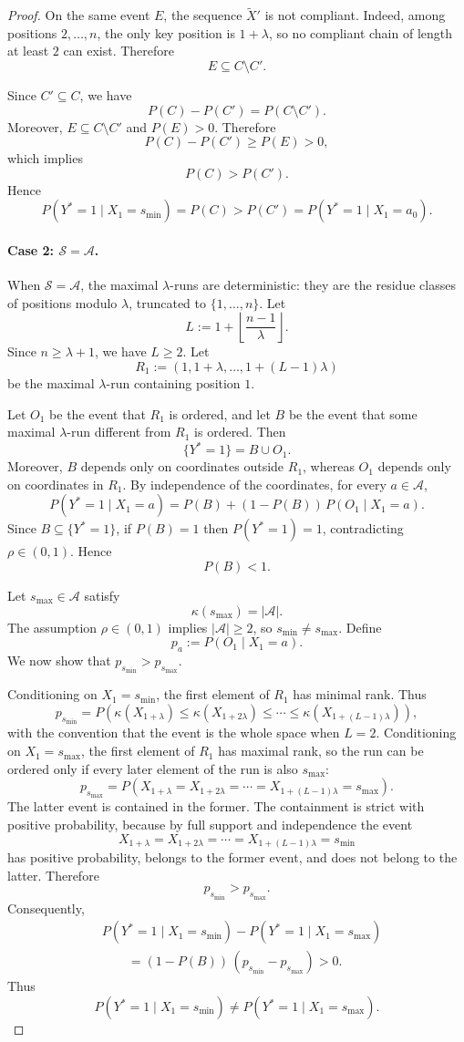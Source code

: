 \documentclass{article}
\theoremstyle{plain}
\theoremstyle{definition}
\theoremstyle{remark}
\begin{document}
\begin{proof}
On the same event $E$, the sequence $\widetilde X'$ is not compliant.
Indeed, among positions $2,\ldots,n$, the only key position is $1+\lambda$,
so no compliant chain of length at least $2$ can exist. Therefore
\[
E \subseteq C\setminus C'.
\]

Since \(C' \subseteq C\), we have
\[
P(C)-P(C') = P(C\setminus C').
\]
Moreover, \(E \subseteq C\setminus C'\) and \(P(E)>0\). Therefore
\[
P(C)-P(C') \ge P(E) > 0,
\]
which implies
\[
P(C) > P(C').
\]
Hence
\[
P(Y^*=1 \mid X_1=s_{\min})
=
P(C)
>
P(C')
=
P(Y^*=1 \mid X_1=a_0).
\]

\paragraph{Case 2: $\mathcal{S}=\mathcal{A}$.}
When $\mathcal{S}=\mathcal{A}$, the maximal $\lambda$-runs are deterministic:
they are the residue classes of positions modulo $\lambda$, truncated to
$\{1,\ldots,n\}$. Let
\[
L := 1+\left\lfloor \frac{n-1}{\lambda}\right\rfloor .
\]
Since $n\geq \lambda+1$, we have $L\geq 2$. Let
\[
R_1 := (1,1+\lambda,\ldots,1+(L-1)\lambda)
\]
be the maximal $\lambda$-run containing position $1$.

Let $O_1$ be the event that $R_1$ is ordered, and let $B$ be the event that
some maximal $\lambda$-run different from $R_1$ is ordered. Then
\[
\{Y^*=1\}=B\cup O_1.
\]
Moreover, $B$ depends only on coordinates outside $R_1$, whereas $O_1$
depends only on coordinates in $R_1$. By independence of the coordinates,
for every $a\in\mathcal{A}$,
\[
P(Y^*=1\mid X_1=a)
=
P(B)+(1-P(B))\,P(O_1\mid X_1=a).
\]
Since $B\subseteq\{Y^*=1\}$, if $P(B)=1$ then $P(Y^*=1)=1$, contradicting
$\rho\in(0,1)$. Hence
\[
P(B)<1.
\]

Let $s_{\max}\in\mathcal{A}$ satisfy
\[
\kappa(s_{\max})=|\mathcal{A}|.
\]
The assumption $\rho\in(0,1)$ implies $|\mathcal{A}|\geq 2$, so
$s_{\min}\neq s_{\max}$. Define
\[
p_a := P(O_1\mid X_1=a).
\]
We now show that $p_{s_{\min}}>p_{s_{\max}}$.

Conditioning on $X_1=s_{\min}$, the first element of $R_1$ has minimal
rank. Thus
\[
p_{s_{\min}}
=
P\!\left(
\kappa(X_{1+\lambda})
\leq
\kappa(X_{1+2\lambda})
\leq
\cdots
\leq
\kappa(X_{1+(L-1)\lambda})
\right),
\]
with the convention that the event is the whole space when $L=2$.
Conditioning on $X_1=s_{\max}$, the first element of $R_1$ has maximal rank,
so the run can be ordered only if every later element of the run is also
$s_{\max}$:
\[
p_{s_{\max}}
=
P\!\left(
X_{1+\lambda}=X_{1+2\lambda}=\cdots=X_{1+(L-1)\lambda}=s_{\max}
\right).
\]
The latter event is contained in the former. The containment is strict with
positive probability, because by full support and independence the event
\[
X_{1+\lambda}=X_{1+2\lambda}=\cdots=X_{1+(L-1)\lambda}=s_{\min}
\]
has positive probability, belongs to the former event, and does not belong to
the latter. Therefore
\[
p_{s_{\min}}>p_{s_{\max}}.
\]
Consequently,
\begin{align*}
&P(Y^*=1\mid X_1=s_{\min})
-
P(Y^*=1\mid X_1=s_{\max})
\\
&\qquad =
(1-P(B))\,(p_{s_{\min}}-p_{s_{\max}})
>0.
\end{align*}
Thus
\[
P(Y^*=1\mid X_1=s_{\min})
\neq
P(Y^*=1\mid X_1=s_{\max}).
\]


\end{proof}
\end{document}
